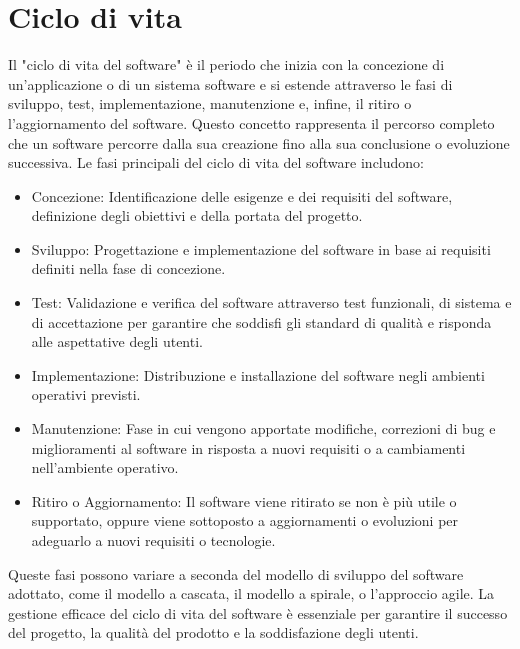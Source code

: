 \documentclass{article}
\begin{document}
\section{Ciclo di vita}
Il "ciclo di vita del software" è il periodo che inizia con la concezione di un'applicazione o di un sistema software e si estende attraverso le fasi di sviluppo, test, implementazione, manutenzione e, infine, il ritiro o l'aggiornamento del software. Questo concetto rappresenta il percorso completo che un software percorre dalla sua creazione fino alla sua conclusione o evoluzione successiva. Le fasi principali del ciclo di vita del software includono:
\begin{itemize}
    \item Concezione: Identificazione delle esigenze e dei requisiti del software, definizione degli obiettivi e della portata del progetto.
    \item Sviluppo: Progettazione e implementazione del software in base ai requisiti definiti nella fase di concezione.
    \item Test: Validazione e verifica del software attraverso test funzionali, di sistema e di accettazione per garantire che soddisfi gli standard di qualità e risponda alle aspettative degli utenti.
    \item Implementazione: Distribuzione e installazione del software negli ambienti operativi previsti.
    \item Manutenzione: Fase in cui vengono apportate modifiche, correzioni di bug e miglioramenti al software in risposta a nuovi requisiti o a cambiamenti nell'ambiente operativo.
    \item Ritiro o Aggiornamento: Il software viene ritirato se non è più utile o supportato, oppure viene sottoposto a aggiornamenti o evoluzioni per adeguarlo a nuovi requisiti o tecnologie.
\end{itemize}
Queste fasi possono variare a seconda del modello di sviluppo del software adottato, come il modello a cascata, il modello a spirale, o l'approccio agile. La gestione efficace del ciclo di vita del software è essenziale per garantire il successo del progetto, la qualità del prodotto e la soddisfazione degli utenti.
\end{document}
